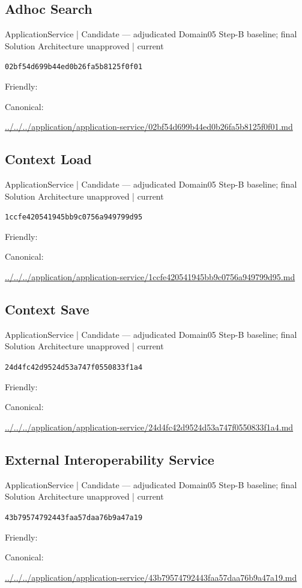 \documentclass[10pt,a4paper]{article}
\begin{document}
\subsection*{Adhoc Search}
{\small ApplicationService | Candidate — adjudicated Domain05 Step-B baseline; final Solution Architecture unapproved | current}\par
\texttt{02bf54d699b44ed0b26fa5b8125f0f01}\par
Friendly: \par
Canonical: \par
{\footnotesize\url{../../../application/application-service/02bf54d699b44ed0b26fa5b8125f0f01.md}}\par
\subsection*{Context Load}
{\small ApplicationService | Candidate — adjudicated Domain05 Step-B baseline; final Solution Architecture unapproved | current}\par
\texttt{1ccfe420541945bb9c0756a949799d95}\par
Friendly: \par
Canonical: \par
{\footnotesize\url{../../../application/application-service/1ccfe420541945bb9c0756a949799d95.md}}\par
\subsection*{Context Save}
{\small ApplicationService | Candidate — adjudicated Domain05 Step-B baseline; final Solution Architecture unapproved | current}\par
\texttt{24d4fc42d9524d53a747f0550833f1a4}\par
Friendly: \par
Canonical: \par
{\footnotesize\url{../../../application/application-service/24d4fc42d9524d53a747f0550833f1a4.md}}\par
\subsection*{External Interoperability Service}
{\small ApplicationService | Candidate — adjudicated Domain05 Step-B baseline; final Solution Architecture unapproved | current}\par
\texttt{43b79574792443faa57daa76b9a47a19}\par
Friendly: \par
Canonical: \par
{\footnotesize\url{../../../application/application-service/43b79574792443faa57daa76b9a47a19.md}}\par
\end{document}
